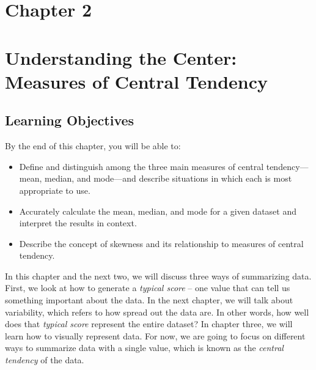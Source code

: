 \documentclass[
  letterpaper,
  DIV=11,
  numbers=noendperiod]{scrreprt}
\begin{document}

\chapter{Chapter 2}\label{chapter-2}


\chapter*{Understanding the Center: Measures of Central
Tendency}\label{understanding-the-center-measures-of-central-tendency}


\section*{Learning Objectives}\label{learning-objectives-1}


By the end of this chapter, you will be able to:

\begin{itemize}
\item
  Define and distinguish among the three main measures of central
  tendency---mean, median, and mode---and describe situations in which
  each is most appropriate to use.
\item
  Accurately calculate the mean, median, and mode for a given dataset
  and interpret the results in context.
\item
  Describe the concept of skewness and its relationship to measures of
  central tendency.
\end{itemize}

In this chapter and the next two, we will discuss three ways of
summarizing data. First, we look at how to generate a \emph{typical
score} -- one value that can tell us something important about the data.
In the next chapter, we will talk about variability, which refers to how
spread out the data are. In other words, how well does that
\emph{typical score} represent the entire dataset? In chapter three, we
will learn how to visually represent data. For now, we are going to
focus on different ways to summarize data with a single value, which is
known as the \emph{central tendency} of the data.
\end{document}
